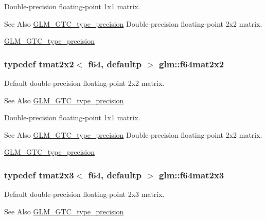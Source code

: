 Double-\/precision floating-\/point 1x1 matrix. \begin{DoxySeeAlso}{See Also}
\hyperlink{group__gtc__type__precision}{G\-L\-M\-\_\-\-G\-T\-C\-\_\-type\-\_\-precision} Double-\/precision floating-\/point 2x2 matrix. 

\hyperlink{group__gtc__type__precision}{G\-L\-M\-\_\-\-G\-T\-C\-\_\-type\-\_\-precision} 
\end{DoxySeeAlso}
\hypertarget{group__gtc__type__precision_ga1e14d8b4e18898be51cd719fda213dcc}{
\subsubsection[{f64mat2x2}]{\setlength{\rightskip}{0pt plus 5cm}typedef tmat2x2$<$ f64, defaultp $>$ {\bf glm\-::f64mat2x2}}}\label{group__gtc__type__precision_ga1e14d8b4e18898be51cd719fda213dcc}
Default double-\/precision floating-\/point 2x2 matrix. \begin{DoxySeeAlso}{See Also}
\hyperlink{group__gtc__type__precision}{G\-L\-M\-\_\-\-G\-T\-C\-\_\-type\-\_\-precision}
\end{DoxySeeAlso}
Double-\/precision floating-\/point 1x1 matrix. \begin{DoxySeeAlso}{See Also}
\hyperlink{group__gtc__type__precision}{G\-L\-M\-\_\-\-G\-T\-C\-\_\-type\-\_\-precision} Double-\/precision floating-\/point 2x2 matrix. 

\hyperlink{group__gtc__type__precision}{G\-L\-M\-\_\-\-G\-T\-C\-\_\-type\-\_\-precision} 
\end{DoxySeeAlso}
\hypertarget{group__gtc__type__precision_ga6d0196bded514d55e26e0f68dd38b37b}{
\subsubsection[{f64mat2x3}]{\setlength{\rightskip}{0pt plus 5cm}typedef tmat2x3$<$ f64, defaultp $>$ {\bf glm\-::f64mat2x3}}}\label{group__gtc__type__precision_ga6d0196bded514d55e26e0f68dd38b37b}
Default double-\/precision floating-\/point 2x3 matrix. \begin{DoxySeeAlso}{See Also}
\hyperlink{group__gtc__type__precision}{G\-L\-M\-\_\-\-G\-T\-C\-\_\-type\-\_\-precision}
\end{DoxySeeAlso}
